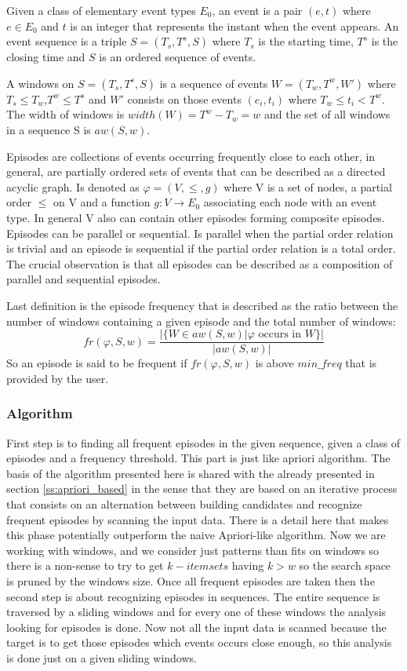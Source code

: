 Given a class of elementary event types $E_{0}$, an event is a pair $(e,t)$
where $e \in E_{0}$ and $t$ is an integer that represents the instant when
the event appears. An event sequence is a triple $S=(T_{s},T^{s},S)$ where
$T_{s}$ is the starting time, $T^{s}$ is the closing time and $S$ is an ordered
sequence of events.

A windows on $S=(T_{s},T^{s},S)$ is a sequence of events $W=(T_{w},T^{w},W')$
where $T_{s} \leq T_{w}$,$T^{w} \leq T^{s}$ and $W'$ consists on those events
$(e_{i},t_{i})$ where $T_{w} \leq t_{i} < T^{w}$. The width of windows is
$width(W)=T^{w}-T_{w}=w$ and the set of all windows in a sequence S is
$aw(S,w)$. 

Episodes are collections of events occurring frequently close to each other, in
general, are partially ordered sets of events that can be described as a
directed acyclic graph. Is denoted as $\varphi =(V,\le,g)$ where V is a set of
nodes, a partial order $\le$ on V and a function $g:V \rightarrow E_{0}$
associating each node with an event type. In general V also can contain other
episodes forming composite episodes. Episodes can be parallel or sequential.
Is parallel when the partial order relation is trivial and an episode is
sequential if the partial order relation is a total order. The crucial
observation is that all episodes can be described as a composition of parallel
and sequential episodes.

Last definition is the episode frequency that is described as the ratio between
the number of windows containing a given episode and the total number of
windows:
$$
fr(\varphi,S,w)=\frac{|\text{\{}W \in aw(S,w) | \varphi \text{ occurs in }
W\text{\}}|}{|aw(S,w)|}
$$
So an episode is said to be frequent if $fr(\varphi,S,w)$ is above $min\text{\_}freq$
that is provided by the user.

\subsubsection{Algorithm}

First step is to finding all frequent episodes in the given sequence, given a
class of episodes and a frequency threshold. This part is just like apriori
algorithm. The basis of the algorithm presented here is shared with the already 
presented in section \ref{ss:apriori_based} in the sense that they are based on an
iterative process that consists on an alternation between building candidates 
and recognize frequent episodes by scanning the input data. There is a detail
here that makes this phase potentially outperform the naive Apriori-like
algorithm. Now we are working with windows, and we consider just patterns than
fits on windows so there is a non-sense to try to get $k-itemsets$ having $k >
w$ so the search space is pruned by the windows size. Once all frequent 
episodes are taken then the second step is about recognizing episodes in 
sequences. The entire sequence is traversed by a sliding windows and for every one of these windows the analysis looking for episodes is done. 
Now not all the input data is scanned because the target is to get those 
episodes which events occurs close enough, so this analysis is done
just on a given sliding windows. 

